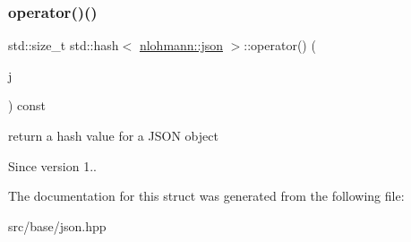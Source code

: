 \subsubsection{\texorpdfstring{operator()()}{operator()()}}
{\footnotesize\ttfamily std\+::size\+\_\+t std\+::hash$<$ \mbox{\hyperlink{namespacenlohmann_a2bfd99e845a2e5cd90aeaf1b1431f474}{nlohmann\+::json}} $>$\+::operator() (\begin{DoxyParamCaption}\item[{const \mbox{\hyperlink{namespacenlohmann_a2bfd99e845a2e5cd90aeaf1b1431f474}{nlohmann\+::json}} \&}]{j }\end{DoxyParamCaption}) const\hspace{0.3cm}{\ttfamily [inline]}}



return a hash value for a J\+S\+ON object 

\begin{DoxySince}{Since}
version 1.. 
\end{DoxySince}


The documentation for this struct was generated from the following file\+:\begin{DoxyCompactItemize}
\item 
src/base/json.\+hpp\end{DoxyCompactItemize}
